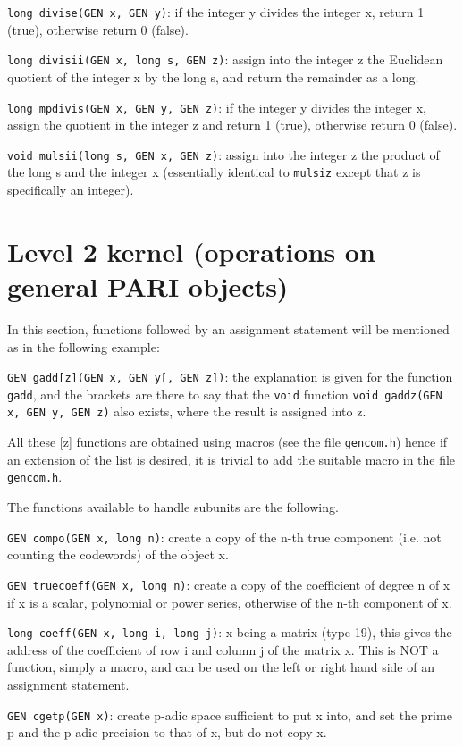 {\tt long divise(GEN x, GEN y)}: if the integer y divides the integer x, return
1 (true), otherwise return 0 (false).

{\tt long divisii(GEN x, long s, GEN z)}: assign into the integer z the 
Euclidean quotient of the integer x by the long s, and return the remainder
as a long.

{\tt long mpdivis(GEN x, GEN y, GEN z)}: if the integer y divides the integer
x, assign the quotient in the integer z and return 1 (true), otherwise return
0 (false).

{\tt void mulsii(long s, GEN x, GEN z)}: assign into the integer z the product
of the long s and the integer x (essentially identical to {\tt mulsiz} except
that z is specifically an integer).

\section{Level 2 kernel (operations on general PARI objects)}

In this section, functions followed by an assignment statement will be 
mentioned as in the following example:

{\tt GEN gadd[z](GEN x, GEN y[, GEN z])}: the explanation is given for
the function {\tt gadd}, and the brackets are there to say
that the {\tt void} function {\tt void gaddz(GEN x, GEN y, GEN z)} also
exists, where the result is assigned into z.

All these [z] functions are obtained using macros (see the file {\tt gencom.h})
hence if an extension of the list is desired, it is trivial to add the
suitable macro in the file {\tt gencom.h}.

The functions available to handle subunits are the following.

{\tt GEN compo(GEN x, long n)}: create a copy of the n-th true component (i.e.
not counting the codewords) of the object x.

{\tt GEN truecoeff(GEN x, long n)}: create a copy of the coefficient of degree
n of x if x is a scalar, polynomial or power series, otherwise of the n-th
component of x.

{\tt long coeff(GEN x, long i, long j)}: x being a matrix (type 19), this gives
the address of the coefficient of row i and column j of the matrix x. This is
NOT a function, simply a macro, and can be used on the left or right hand side
of an assignment statement.


{\tt GEN cgetp(GEN x)}: create p-adic space sufficient to put x into, and
set the prime p and the p-adic precision to that of x, but do not copy x.

